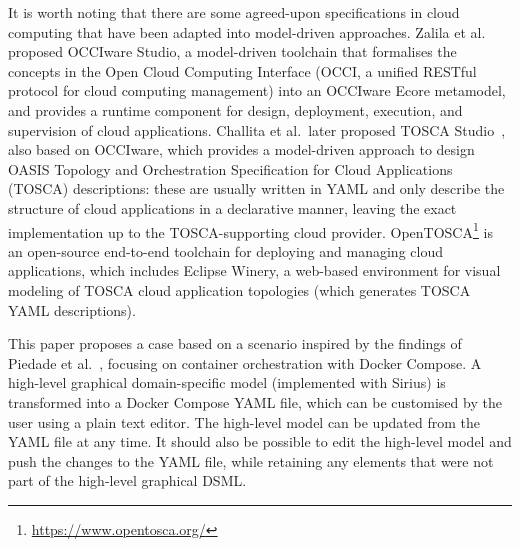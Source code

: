 \documentclass[sigconf,review]{acmart}
\begin{document}
It is worth noting that there are some agreed-upon specifications in cloud
computing that have been adapted into model-driven approaches. Zalila et
al.~\cite{zalila_model-driven_2019} proposed OCCIware Studio, a model-driven
toolchain that formalises the concepts in the Open Cloud Computing Interface
(OCCI, a unified RESTful protocol for cloud computing management) into an
OCCIware Ecore metamodel, and provides a runtime component for design,
deployment, execution, and supervision of cloud applications. Challita et
al.\ later proposed TOSCA Studio~\cite{challita_model-based_2021}, also based on
OCCIware, which provides a model-driven approach to design OASIS Topology and
Orchestration Specification for Cloud Applications (TOSCA) descriptions: these
are usually written in YAML and only describe the structure of cloud
applications in a declarative manner, leaving the exact implementation up to the
TOSCA-supporting cloud provider.
OpenTOSCA\footnote{\url{https://www.opentosca.org/}} is an open-source
end-to-end toolchain for deploying and managing cloud applications, which
includes Eclipse Winery, a web-based environment for visual modeling of TOSCA
cloud application topologies (which generates TOSCA YAML descriptions).

This paper proposes a case based on a scenario inspired by the findings of
Piedade et al.~\cite{piedade_visual_2022}, focusing on container orchestration
with Docker Compose. A high-level graphical domain-specific model (implemented
with Sirius) is transformed into a Docker Compose YAML file, which can be
customised by the user using a plain text editor. The high-level model can be
updated from the YAML file at any time. It should also be possible to edit the
high-level model and push the changes to the YAML file, while retaining any
elements that were not part of the high-level graphical DSML.
\end{document}
